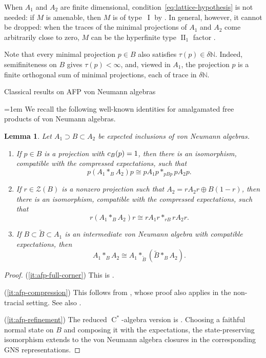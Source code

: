 \documentclass[11pt]{amsart}
\makeatletter
\numberwithin{equation}{section}
\def\subsection{\@startsection{subsection}{2}%
  \z@{.7\linespacing\@plus.7\linespacing}{.3\linespacing}%
  {\normalfont\bfseries}}
\newcommand{\nn}{\mathbb N}
\newcommand{\Z}{\mathcal Z}
\DeclareMathOperator{\I}{I}
\DeclareMathOperator{\II}{II}
\newcommand{\Cstar}{\operatorname{C}^*}
\newcommand{\@optsub}[1]{\if\relax\detokenize{#1}\relax\else_{#1}\fi}
\newcommand{\csupp}[2][]{c\@optsub{#1}(#2)}
\newtheorem{Lem}[The]{Lemma}
\theoremstyle{definition}
\makeatother
\begin{document}
When $A_1$ and $A_2$ are finite dimensional, condition~\eqref{eq:lattice-hypothesis} is not needed: if $M$ is amenable, then $M$ is of type~$\I$ by \cite[Theorem~5.1]{Dy95}. In general, however, it cannot be dropped: when the traces of the minimal projections of $A_1$ and $A_2$ come arbitrarily close to zero, $M$ can be the hyperfinite type $\II_1$ factor \cite[Example~5.5]{Dy95}.

Note that every minimal projection $p\in B$ also satisfies $\tau(p)\in\delta\nn$. Indeed, semifiniteness on $B$ gives $\tau(p)<\infty$, and, viewed in $A_1$, the projection $p$ is a finite orthogonal sum of minimal projections, each of trace in $\delta\nn$.


\subsection{Classical results on AFP von Neumann algebras}

{\emergencystretch=1em
We recall the following well-known identities for amalgamated free products of von Neumann algebras.\par}

\begin{Lem}
    \label{lem:afp-identities}
    Let $A_1\supset B\subset A_2$ be expected inclusions of von Neumann algebras.
    \begin{enumerate}[\rm (i)]
        \item\label{it:afp-full-corner} If $p\in B$ is a projection with $\csupp[B]{p}=1$, then there is an isomorphism, compatible with the compressed expectations, such that
        $$
            p(A_1\ast_B A_2)p\cong pA_1p\ast_{pBp}pA_2p.
        $$
        \item\label{it:afp-compression} If $r\in\Z(B)$ is a nonzero projection such that $A_2=rA_2r\oplus B(1-r)$, then there is an isomorphism, compatible with the compressed expectations, such that
        $$
            r(A_1\ast_B A_2)r\cong rA_1r\ast_{rB}rA_2r.
        $$
        \item\label{it:afp-refinement} If $B\subset\tilde{B}\subset A_1$ is an intermediate von Neumann algebra with compatible expectations, then
        $$
            A_1\ast_B A_2\cong A_1\ast_{\tilde{B}}(\tilde{B}\ast_B A_2).
        $$
    \end{enumerate}
\end{Lem}

\begin{proof}
    \textup{(\ref*{it:afp-full-corner})} This is \cite[Lemma~4.6]{Ue13}.

    \textup{(\ref*{it:afp-compression})} This follows from \cite[Lemma~4.3]{Dy95}, whose proof also applies in the non-tracial setting. See also \cite{Ue16}.

    \textup{(\ref*{it:afp-refinement})} The reduced $\Cstar$-algebra version is \cite[Corollary~3.9]{NSS02}. Choosing a faithful normal state on $B$ and composing it with the expectations, the state-preserving isomorphism extends to the von Neumann algebra closures in the corresponding GNS representations.
\end{proof}
\end{document}
